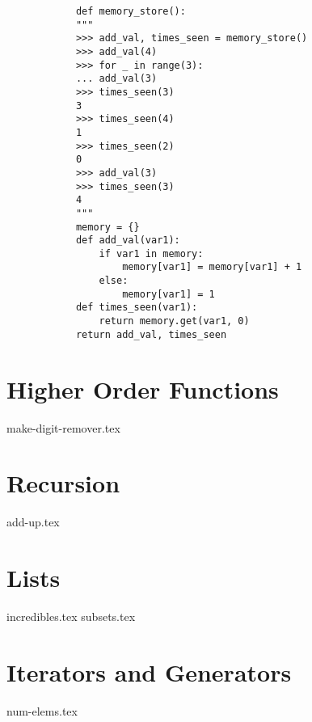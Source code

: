 \documentclass{exam}
\begin{document}
    \begin{solution}
        \begin{lstlisting}
            def memory_store():
            """
            >>> add_val, times_seen = memory_store()
            >>> add_val(4)
            >>> for _ in range(3):
            ... add_val(3)
            >>> times_seen(3)
            3
            >>> times_seen(4)
            1
            >>> times_seen(2)
            0
            >>> add_val(3)
            >>> times_seen(3)
            4
            """
            memory = {}
            def add_val(var1):
                if var1 in memory:
                    memory[var1] = memory[var1] + 1
                else:
                    memory[var1] = 1
            def times_seen(var1):
                return memory.get(var1, 0)
            return add_val, times_seen
        \end{lstlisting}
    \end{solution}

\section{Higher Order Functions}
\begin{questions}
    {make-digit-remover.tex}
\end{questions}

\section{Recursion}
\begin{questions}
    {add-up.tex}
\end{questions}

\section{Lists}
\begin{questions}
    {incredibles.tex}
    {subsets.tex}
\end{questions}

\newpage

\section{Iterators and Generators}
\begin{questions}
    {num-elems.tex}
\end{questions}
\end{document}
